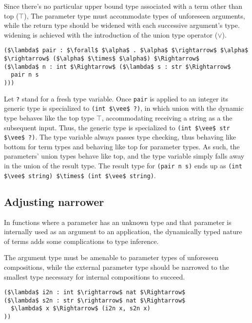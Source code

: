 \documentclass[sigplan,screen]{acmart}
\begin{document}
Since there's no particular upper bound type associated with 
a term other than top ($\top$), 
The parameter type must accommodate types of unforeseen arguments, 
while the return type should be widened with each successive
argument's type.
widening is achieved with the introduction of the union type operator ($\vee$).

\begin{lstlisting}
($\lambda$ pair : $\forall$ $\alpha$ . $\alpha$ $\rightarrow$ $\alpha$ $\rightarrow$ ($\alpha$ $\times$ $\alpha$) $\Rightarrow$ 
($\lambda$ n : int $\Rightarrow$ ($\lambda$ s : str $\Rightarrow$ 
  pair n s
)))
\end{lstlisting}

Let \lstinline{?} stand for a fresh type variable.
Once \lstinline{pair} is applied to an integer its generic type is specialized to 
\lstinline{(int $\vee$ ?)}, 
in which union with the dynamic type behaves like the top type $\top$, 
accommodating receiving a string as a the subsequent input.
Thus, the generic type is specialized to 
\newline
\lstinline{(int $\vee$ str $\vee$ ?)}.
The type variable always passes type checking, 
thus behaving like bottom for term types
and behaving like top for parameter types.
As such, the parameters' union types behave like top,
and the type variable simply falls away in the union of the result type. 
The result type for \lstinline{(pair n s)} ends up as 
\lstinline{(int $\vee$ string) $\times$ (int $\vee$ string)}. 

\subsection{Adjusting narrower}

In functions where a parameter has an unknown type and that parameter is 
internally used as an argument to an application, the dynamically typed 
nature of terms adds some complications to type inference.

The argument type must be amenable to parameter types 
of unforeseen compositions,
while the external parameter type should be narrowed 
to the smallest type necessary for internal compositions to
succeed.

\begin{lstlisting}
($\lambda$ i2n : int $\rightarrow$ nat $\Rightarrow$ 
($\lambda$ s2n : str $\rightarrow$ nat $\Rightarrow$ 
  $\lambda$ x $\Rightarrow$ (i2n x, s2n x)
))

\end{lstlisting}
\end{document}
